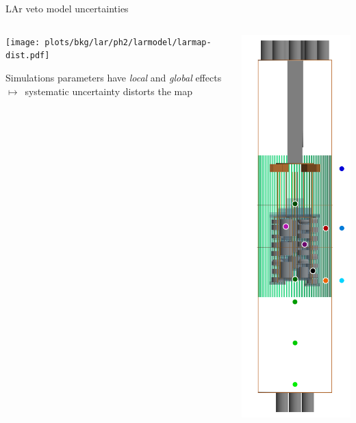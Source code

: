 \documentclass[10pt,aspectratio=169]{beamer}
\newcommand{\arrow}{$\longmapsto$}
\begin{document}
\begin{frame}{LAr veto model uncertainties}
  \begin{columns}
    \begin{column}{0.85\textwidth}
      \begin{center}
        \texttt{[image: plots/bkg/lar/ph2/larmodel/larmap-dist.pdf]}
      \end{center}
      Simulations parameters have \emph{local} and \emph{global} effects
      \arrow\ systematic uncertainty \alert{distorts} the map
    \end{column}
    \begin{column}{0.15\textwidth}
      \begin{center}
        \includegraphics[height=0.9\textheight]{plots/bkg/lar/ph2/larmodel/lar-points-position.pdf}

\end{center}
\end{column}
\end{columns}
\end{frame}
\end{document}
